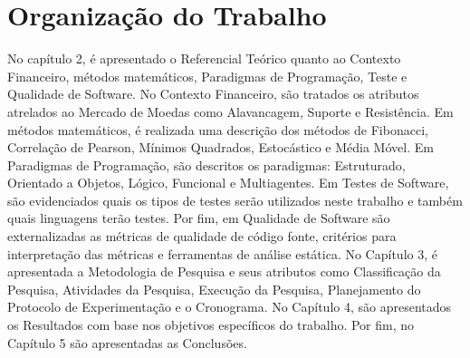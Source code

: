\section{Organização do Trabalho}
No capítulo 2, é apresentado o Referencial Teórico quanto ao Contexto Financeiro, métodos matemáticos, Paradigmas de Programação, Teste e Qualidade de Software. No Contexto Financeiro, são tratados os atributos atrelados ao Mercado de Moedas como Alavancagem, Suporte e Resistência. Em métodos matemáticos, é realizada uma descrição dos métodos de Fibonacci, Correlação de Pearson, Mínimos Quadrados, Estocástico e Média Móvel. Em Paradigmas de Programação, são descritos os paradigmas: Estruturado, Orientado a Objetos, Lógico, Funcional e Multiagentes. Em Testes de Software, são evidenciados quais os tipos de testes serão utilizados neste trabalho e também quais linguagens terão testes. Por fim, em Qualidade de Software são externalizadas as métricas de qualidade de código fonte, critérios para interpretação das métricas e ferramentas de análise estática. No Capítulo 3, é apresentada a Metodologia de Pesquisa e seus atributos como Classificação da Pesquisa, Atividades da Pesquisa, Execução da Pesquisa, Planejamento do Protocolo de Experimentação e o Cronograma. No Capítulo 4, são apresentados os Resultados com base nos objetivos específicos do trabalho. Por fim, no Capítulo 5 são apresentadas as Conclusões.
